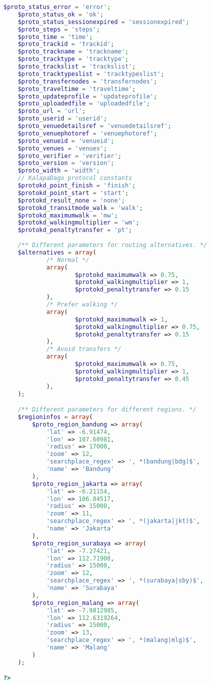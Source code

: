\begin{lstlisting}[language=PHP,basicstyle=\tiny,caption=constants.php,label={lst:constants.php}]
	$proto_status_error = 'error';
	$proto_status_ok = 'ok';
	$proto_status_sessionexpired = 'sessionexpired';
	$proto_steps = 'steps';
	$proto_time = 'time';
	$proto_trackid = 'trackid';
	$proto_trackname = 'trackname';
	$proto_tracktype = 'tracktype';
	$proto_trackslist = 'trackslist';
	$proto_tracktypeslist = 'tracktypeslist';
	$proto_transfernodes = 'transfernodes';
	$proto_traveltime = 'traveltime';
	$proto_updateprofile = 'updateprofile';
	$proto_uploadedfile = 'uploadedfile';
	$proto_url = 'url';
	$proto_userid = 'userid';
	$proto_venuedetailsref = 'venuedetailsref';
	$proto_venuephotoref = 'venuephotoref';
	$proto_venueid = 'venueid';
	$proto_venues = 'venues';
	$proto_verifier = 'verifier';
	$proto_version = 'version';
	$proto_width = 'width';
	// KalapaDago protocol constants
	$protokd_point_finish = 'finish';
	$protokd_point_start = 'start';
	$protokd_result_none = 'none';
	$protokd_transitmode_walk = 'walk';
	$protokd_maximumwalk = 'mw';
	$protokd_walkingmultiplier = 'wm';
	$protokd_penaltytransfer = 'pt';
	
	/** Different parameters for routing alternatives. */
	$alternatives = array(
			/* Normal */
			array(
					$protokd_maximumwalk => 0.75,
					$protokd_walkingmultiplier => 1,
					$protokd_penaltytransfer => 0.15
			),
			/* Prefer walking */
			array(
					$protokd_maximumwalk => 1,
					$protokd_walkingmultiplier => 0.75,
					$protokd_penaltytransfer => 0.15
			),
			/* Avoid transfers */
			array(
					$protokd_maximumwalk => 0.75,
					$protokd_walkingmultiplier => 1,
					$protokd_penaltytransfer => 0.45
			),
	);

	/** Different parameters for different regions. */
	$regioninfos = array(
		$proto_region_bandung => array(
			'lat' => -6.91474,
			'lon' => 107.60981,
			'radius' => 17000,
			'zoom' => 12,
			'searchplace_regex' => ', *(bandung|bdg)$',
			'name' => 'Bandung'
		),
		$proto_region_jakarta => array(
			'lat' => -6.21154,
			'lon' => 106.84517,
			'radius' => 15000,
			'zoom' => 11,
			'searchplace_regex' => ', *(jakarta|jkt)$',
			'name' => 'Jakarta'
		),
		$proto_region_surabaya => array(
			'lat' => -7.27421,
			'lon' => 112.71908,
			'radius' => 15000,
			'zoom' => 12,
			'searchplace_regex' => ', *(surabaya|sby)$',
			'name' => 'Surabaya'
		),
		$proto_region_malang => array(
			'lat' => -7.9812985,
			'lon' => 112.6319264,
			'radius' => 15000,
			'zoom' => 13,
			'searchplace_regex' => ', *(malang|mlg)$',
			'name' => 'Malang'				
		)
	);

?>
\end{lstlisting}
